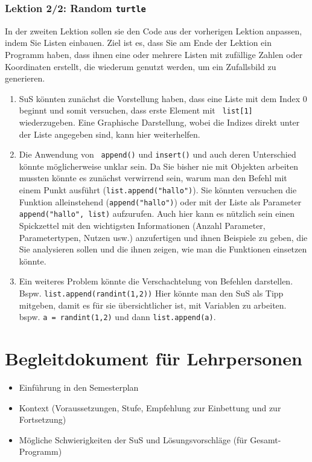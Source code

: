 \begin{myExBox}[title=DL \themycounter]
\subsubsection*{Lektion 2/2: Random \lstinline|turtle|}
In der zweiten Lektion sollen sie den Code aus der vorherigen Lektion anpassen, indem Sie Listen einbauen. Ziel ist es, dass Sie am Ende der Lektion ein Programm haben, dass ihnen eine oder mehrere Listen mit zufällige Zahlen oder Koordinaten erstellt, die wiederum genutzt werden, um ein Zufallsbild zu generieren. 

\begin{myExBox}[title=Mögliche Schwierigkeiten \& geeignete Massnahmen]
\begin{enumerate}
    \item SuS könnten zunächst die Vorstellung haben, dass eine Liste mit dem Index 0 beginnt und somit versuchen, dass erste Element mit \lstinline| list[1] | wiederzugeben. Eine Graphische Darstellung, wobei die Indizes direkt unter der Liste angegeben sind, kann hier weiterhelfen.
    \item Die Anwendung von \lstinline| append()| und \lstinline|insert()| und auch deren Unterschied könnte möglicherweise unklar sein. Da Sie bisher nie mit Objekten arbeiten mussten könnte es zunächst verwirrend sein, warum man den Befehl mit einem Punkt ausführt (\lstinline|list.append("hallo")|). Sie könnten versuchen die Funktion alleinstehend (\lstinline|append("hallo")|) oder mit der Liste als Parameter \lstinline|append("hallo", list)| aufzurufen. Auch hier kann es nützlich sein einen Spickzettel mit den wichtigsten Informationen (Anzahl Parameter, Parametertypen, Nutzen usw.) anzufertigen und ihnen Beispiele zu geben, die Sie analysieren sollen und die ihnen zeigen, wie man die Funktionen einsetzen könnte.
    \item Ein weiteres Problem könnte die Verschachtelung von Befehlen darstellen. Bspw. \lstinline|list.append(randint(1,2))| Hier könnte man den SuS als Tipp mitgeben, damit es für sie übersichtlicher ist, mit Variablen zu arbeiten. bspw. \lstinline|a = randint(1,2)| und dann \lstinline|list.append(a)|. 
\end{enumerate}
\end{myExBox}
\end{myExBox}
\newpage{}


\section{Begleitdokument für Lehrpersonen}
\begin{itemize}
    \item Einführung in den Semesterplan
    \item Kontext (Voraussetzungen, Stufe, Empfehlung zur Einbettung und zur Fortsetzung)
    \item Mögliche Schwierigkeiten der SuS und Lösungsvorschläge (für Gesamt-Programm)
\end{itemize}